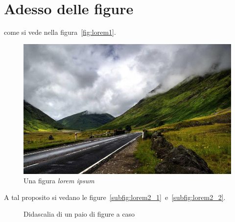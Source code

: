 \lipsum[1]

\section{Adesso delle figure}

\lipsum[1][1-5] come si vede nella figura~\vref{fig:lorem1}.

\begin{figure}
\centering
\includegraphics[width=\textwidth]{./Figures/img1.jpg}
\caption{Una figura \emph{lorem ipsum}}
\label{fig:lorem1}
\end{figure}

\lipsum[1][1-5]

\lipsum[1][1-5]

A tal proposito si vedano le figure~\ref{subfig:lorem2_1}~e~\vref{subfig:lorem2_2}.

\begin{figure}
\centering
{} \quad
{}
\caption{Didascalia di un paio di figure a caso}
\label{fig:lorem2}
\end{figure}
